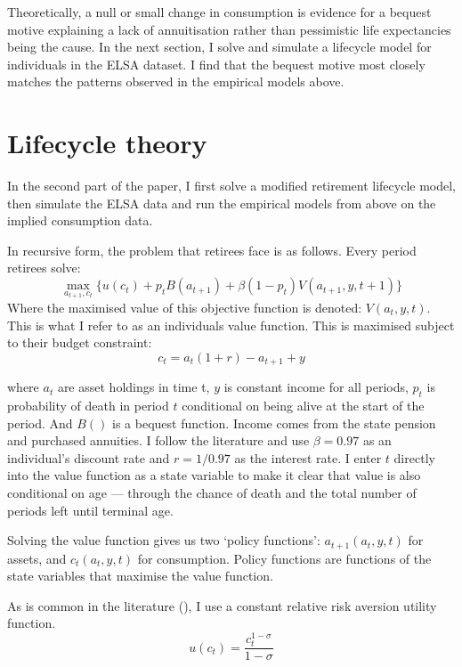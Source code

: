 \documentclass[12pt]{article}
\begin{document}
Theoretically, a null or small change in consumption is evidence for a
bequest motive explaining a lack of annuitisation rather than pessimistic life
expectancies being the cause. In the next section, I solve and simulate a
lifecycle model for individuals in the ELSA dataset. I find that the bequest
motive most closely matches the patterns observed in the empirical models above.

\section{Lifecycle theory}

In the second part of the paper, I first solve a modified retirement lifecycle
model, then simulate the ELSA data and run the empirical models from
above on the implied consumption data.

In recursive form, the problem that retirees face is as follows. Every period
retirees solve:
\begin{equation*}
  \label{eq:retirement-problem}
  \underset{a_{t+1}, c_{t}}{\max} \{ u(c_{t}) + p_{t}B(a_{t+1}) + \beta(1-p_{t})V(a_{t+1}, y, t+1) \}
\end{equation*}
Where the maximised value of this objective function is denoted: $V(a_{t}, y,
  t)$. This is what I refer to as an individuals value function.
This is maximised subject to their budget constraint:
\begin{equation*}
  \label{eq:budget-constraint}
  c_{t} =a_{t}(1 +r) -  a_{t+1} + y
\end{equation*}

where $a_{t}$ are asset holdings in time t, $y$ is constant income for all
periods, $p_{t}$ is probability of death in period $t$ conditional on being
alive at the start of the period. And $B()$ is a bequest function. Income comes
from the state pension and purchased annuities. I follow the literature and use
$\beta = 0.97$ as an individual's discount rate and $r = 1/0.97$ as the interest
rate. I enter $t$ directly into the value function as a state variable to make
it clear that value is also conditional on age --- through the chance of death
and the total number of periods left until terminal age.

Solving the value function gives us two `policy functions': $a_{t+1}(a_{t},
  y,t)$ for assets, and $c_{t}(a_{t}, y, t)$ for consumption. Policy
functions are functions of the state variables that maximise the value function.

As is common in the literature (\cite{lockwood-red-2012,de-nardi-et-al-2010}), I
use a constant relative risk aversion utility function.
\begin{equation*}
  \label{eq:utility}
  u(c_{t}) = \frac{c_{t}^{1 - \sigma}}{1 - \sigma}
\end{equation*}
\end{document}
